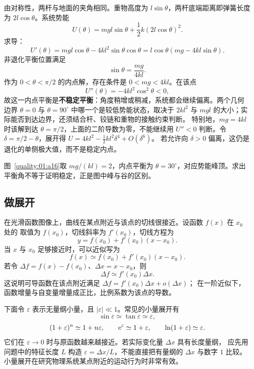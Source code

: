 {\begin{xesolution}
由对称性，两杆与地面的夹角相同。重物高度为 $l\sin\theta$，两杆底端距离即弹簧长度为
$2l\cos\theta$。系统势能
\[
 U(\theta)=mgl\sin\theta+\frac12k(2l\cos\theta)^2.
\]
求导：
\[
 U'(\theta)=mgl\cos\theta-4kl^2\sin\theta\cos\theta
 =l\cos\theta(mg-4kl\sin\theta).
\]
非退化平衡位置满足
\[
 \boxed{\sin\theta=\frac{mg}{4kl}}.
\]
作为 $0<\theta<\pi/2$ 的内点解，存在条件是 $0<mg<4kl$。在该点
\[
 U''(\theta)=-4kl^2\cos^2\theta<0,
\]
故这一内点平衡是\textbf{不稳定平衡}：角度稍增或稍减，系统都会继续偏离。两个几何
边界 $\theta=0$ 与 $\theta=90^\circ$ 中哪一个是较低势能状态，取决于 $2kl^2$ 与
$mgl$ 的大小；实际能否到达边界，还须结合杆、铰链和重物的接触约束判断。
特别地，$mg=4kl$ 时该解到达 $\theta=\pi/2$，上面的二阶导数为零，不能继续用
$U''<0$ 判断。令 $\delta=\pi/2-\theta$，展开得
$U=4kl^2-\tfrac12kl^2\delta^4+O(\delta^6)$。
若允许向 $\delta>0$ 偏离，这仍是退化的单侧极大值，而不是稳定内点。


图~\ref{quality:01:a16}取 $mg/(kl)=2$，内点平衡为 $\theta=30^\circ$，对应势能峰顶。求出平衡角不等于证明稳定，正是图中峰与谷的区别。
\end{xesolution}

\subsection{做展开}

在光滑函数图像上，曲线在某点附近与该点的切线很接近。设函数 $f(x)$ 在 $x_0$ 处的
取值为 $f(x_0)$，切线斜率为 $f'(x_0)$，切线方程为
\begin{equation}
 y=f(x_0)+f'(x_0)(x-x_0).
\end{equation}
当 $x$ 与 $x_0$ 足够接近时，可以近似写为
\begin{equation}
 f(x)\simeq f(x_0)+f'(x_0)(x-x_0).
\end{equation}
若令 $\Delta f=f(x)-f(x_0)$、$\Delta x=x-x_0$，则
\begin{equation}
 \Delta f\simeq f'(x_0)\Delta x.
\end{equation}
这说明可导函数在该点附近满足 $\Delta f=f'(x_0)\Delta x+o(\Delta x)$；
在一阶近似下，函数增量与自变量增量成正比，比例系数为该点的导数。

下面令 $\varepsilon$ 表示无量纲小量，且 $|\varepsilon|\ll1$。常见的小量展开有
\[
 \sin\varepsilon\simeq\tan\varepsilon\simeq\varepsilon,
\]
\[
 (1+\varepsilon)^n\simeq1+n\varepsilon,\qquad
 \mathrm e^{\varepsilon}\simeq1+\varepsilon,\qquad
 \ln(1+\varepsilon)\simeq\varepsilon.
\]
它们在 $\varepsilon\to0$ 时与原函数越来越接近。若实际变化量 $\Delta x$ 具有长度量纲，
应先用问题中的特征长度 $L$ 构造 $\varepsilon=\Delta x/L$，不能直接把有量纲的 $\Delta x$ 与数字 $1$ 比较。
小量展开在研究物理系统某点附近的运动行为时非常有效。

}
